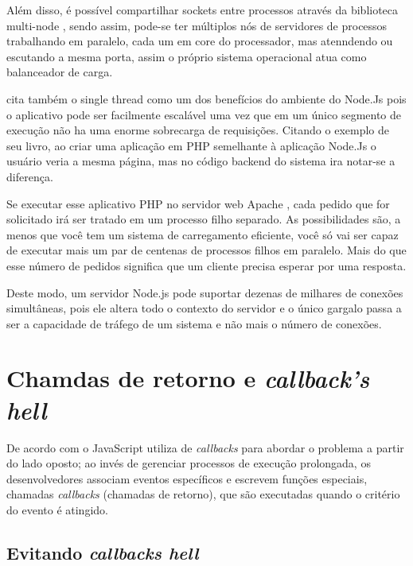   
  Além disso, é possível compartilhar sockets entre processos através da biblioteca multi-node ,
  sendo assim, pode-se ter múltiplos nós de servidores de processos trabalhando em paralelo, 
  cada um em core do processador, mas atenndendo ou escutando a mesma porta, assim o próprio sistema operacional
  atua como balanceador de carga.\cite{Junior:2012}
  
  \cite{Powers:2012} cita também o single thread como um dos benefícios do ambiente do Node.Js 
  pois o aplicativo pode ser facilmente escalável uma vez que em um único segmento de execução não ha uma enorme 
  sobrecarga de requisições. Citando o exemplo de seu livro, ao criar uma aplicação em \ac{PHP} semelhante 
  à aplicação Node.Js o usuário veria a mesma página, mas no código backend do sistema ira notar-se a diferença.
  
  Se executar esse aplicativo \ac{PHP} no servidor web Apache , cada pedido que for solicitado irá ser tratado 
  em um processo filho separado. As possibilidades são, a menos que você tem um sistema de carregamento eficiente, 
  você só vai ser capaz de executar mais um par de centenas de processos filhos em paralelo. 
  Mais do que esse número de pedidos significa que um cliente precisa esperar por uma resposta.\cite{Powers:2012}
  
  Deste modo, um servidor Node.js pode suportar dezenas de milhares de conexões simultâneas, 
  pois ele altera todo o contexto do servidor e o único gargalo passa a ser a capacidade de tráfego 
  de um sistema e não mais o número de conexões.\cite{Abernethy:2011}
  
\section{Chamdas de retorno e \textit{callback's hell}}
\label{chamadas-de-retorno-e-callback-hell}

  De acordo com  o JavaScript utiliza de \textit{callbacks}
  para abordar o problema a  partir do lado oposto; ao invés de gerenciar processos de execução prolongada, 
  os desenvolvedores associam eventos específicos e escrevem funções especiais, chamadas \textit{callbacks}
  (chamadas de retorno), que são executadas quando o critério do evento é atingido.

\subsection{Evitando \textit{callbacks hell}}

